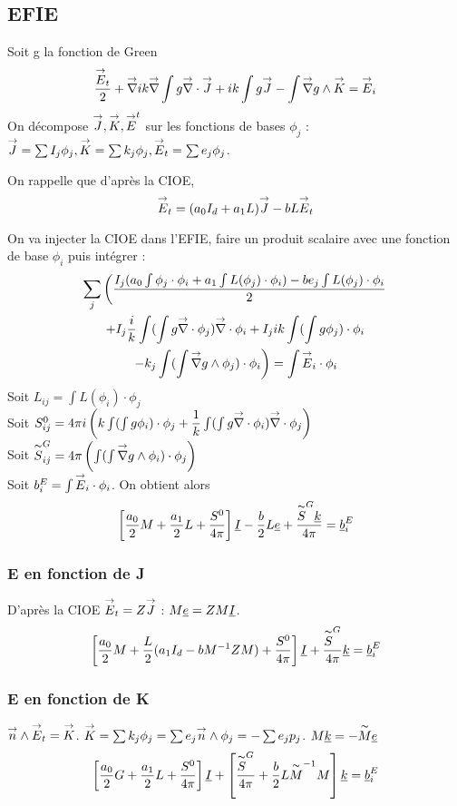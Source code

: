\subsection{EFIE}
Soit g la fonction de Green
\[
  \frac{\vE_t}{2}+\vgrad{i}{k}\vgrad \int  g\vdiv\vJ +  ik\int g\vJ - \int \vgrad g \pvect \vK = \vE_i
  \]
On décompose \(\vJ,\vK,\vE^t\) sur les fonctions de bases \(\phi_j\) : \(\vJ = \sum I_j \phi_j,\vK = \sum k_j \phi_j,\vE_t = \sum e_j \phi_j\). 

On rappelle que d’après la CIOE,
\[
  \vE_t = (a_0I_d+a_1L)\vJ -bL\vE_t
\]

On va injecter la CIOE dans l'EFIE, faire un produit scalaire avec une fonction de base \(\phi_i\) puis intégrer : 
\begin{multline}
  \sum_j \left(\frac{I_j(a_0\int \phi_j \cdot \phi_i +a_1\int L(\phi_j) \cdot \phi_i) -be_j \int L(\phi_j)\cdot \phi_i}{2} \right. \\
  +I_j\frac{i}{k}\int (\int g\vdiv\phi_j)\vdiv \phi_i +  I_j ik\int (\int g\phi_j)\cdot \phi_i\\
  \left. -  k_j\int(\int \vgrad g \pvect \phi_j) \cdot \phi_i \right)= \int \vE_i \cdot \phi_i
\end{multline}
Soit \(L_{ij} = \int L(\phi_i)\cdot\phi_j\)\\
Soit \(S^0_{ij}=4\pi i\left(k\int(\int g\phi_i)\cdot\phi_j + \frac{1}{k}\int(\int g\vdiv\phi_i)\vdiv\phi_j\right)\)\\ 
Soit \(\tilde S^G_{ij} = 4\pi\left(\int(\int \vgrad g \pvect \phi_i) \cdot \phi_j \right)\)\\
Soit \(b_i^E = \int \vE_i \cdot \phi_i\).
On obtient alors 
\[
  \left[\frac{a_0}{2}M + \frac{a_1}{2}L + \frac{S^0}{4\pi}\right]\v I - \frac{b}{2}L\v e+ \frac{\tilde  S^G \v k}{4\pi} = \v b_i^E
\]
\subsubsection{E en fonction de J}
D’après la CIOE \(\vE_t = Z\vJ\) : \(M\v e = Z M\v I\).
\[
  \left[\frac{a_0}{2}M + \frac{L}{2}(a_1I_d - bM^{-1}ZM) + \frac{S^0}{4\pi}\right]\v I + \frac{\tilde S^G }{4\pi}\v k = \v b_i^E
\]
\subsubsection{E en fonction de K}
\(\vn \pvect \vE_t = \vK\).
\(\vK = \sum k_j \phi_j = \sum e_j \vn \pvect \phi_j = -\sum e_j p_j \).
\(M \v k = - \tilde M \v e\)
\[
  \left[\frac{a_0}{2}G + \frac{a_1}{2}L+\frac{S^0}{4\pi}\right]\v I + \left[\frac{\tilde S^G }{4\pi}+  \frac{b}{2}L\tilde M^{-1}M \right]\v k = \v b_i^E
\]
